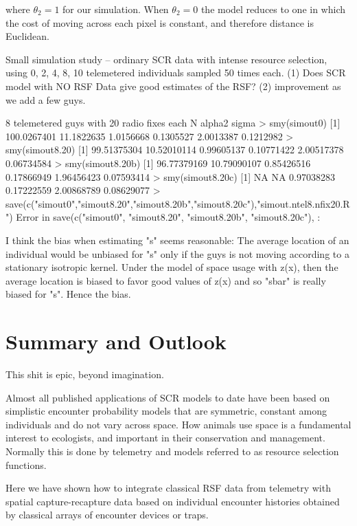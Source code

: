 {\flushleft where} $\theta_2 = 1$ for our simulation.
When $\theta_2=0$ the
model reduces to one in which the cost of moving across each pixel is
constant, and therefore distance is Euclidean.

Small simulation study -- ordinary SCR data with intense resource selection,
using 0, 2, 4, 8, 10 telemetered individuals sampled 50 times each.
(1) Does SCR model with NO RSF Data give good estimates of the RSF?
(2) improvement as we add a few guys.


8 telemetered guys with 20 radio fixes each
     N                              alpha2                 sigma
> smy(simout0)
[1] 100.0267401  11.1822635   1.0156668   0.1305527   2.0013387   0.1212982
> smy(simout8.20)
[1] 99.51375304 10.52010114  0.99605137  0.10771422  2.00517378  0.06734584
> smy(simout8.20b)
[1] 96.77379169 10.79090107  0.85426516  0.17866949  1.96456423  0.07593414
> smy(simout8.20c)
[1]         NA         NA 0.97038283 0.17222559 2.00868789 0.08629077
> save(c("simout0","simout8.20","simout8.20b","simout8.20c"),"simout.ntel8.nfix20.R")
Error in save(c("simout0", "simout8.20", "simout8.20b", "simout8.20c"),  :


I think the bias when estimating "s" seems reasonable: The average
location of an individual would be unbiased for "s" only if the guys
is not moving according to a stationary isotropic kernel. Under the
model of space usage with z(x), then the average location is biased to
favor good values of z(x) and so "sbar" is really biased for
"s". Hence the bias.


\section{Summary and Outlook}

This shit is epic, beyond imagination.





Almost
all published applications of SCR models to date have been based on
simplistic encounter probability models that are symmetric, constant among
individuals and  do not vary across space. How animals use space is a
fundamental interest to ecologists, and important in their
conservation and management. Normally this is done by telemetry and
models referred to as resource selection functions.

Here we have shown how to integrate classical RSF data from telemetry
with spatial capture-recapture data based on individual encounter
histories obtained by classical arrays of encounter devices or traps.

